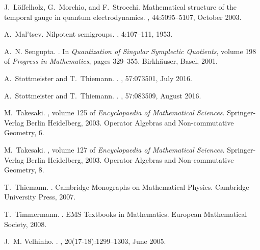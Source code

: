 \documentclass[a4paper,12pt]{amsart}
\numberwithin{equation}{section}
\theoremstyle{definition}
\begin{document}
\begin{thebibliography}{}
J.~L\"offelholz, G.~Morchio, and F.~Strocchi.
\newblock Mathematical structure of the temporal gauge in quantum
  electrodynamics.
, 44:5095--5107, October 2003.

A.~Mal'tsev.
\newblock Nilpotent semigroups.
, 4:107--111, 1953.

A.~N. Sengupta.
.
\newblock In {\em Quantization of Singular Symplectic Quotients}, volume 198 of
  {\em Progress in Mathematics}, pages 329--355. Birkh{\"a}user, Basel, 2001.

A.~Stottmeister and T.~Thiemann.
.
, 57:073501, July 2016.

A.~Stottmeister and T.~Thiemann.
.
, 57:083509, August 2016.

M.~Takesaki.
, volume 125 of {\em
  Encyclopaedia of Mathematical Sciences}.
\newblock Springer-Verlag Berlin Heidelberg, 2003.
\newblock Operator Algebras and Non-commutative Geometry, 6.

M.~Takesaki.
, volume 127 of {\em
  Encyclopaedia of Mathematical Sciences}.
\newblock Springer-Verlag Berlin Heidelberg, 2003.
\newblock Operator Algebras and Non-commutative Geometry, 8.

T.~Thiemann.
.
\newblock Cambridge Monographs on Mathematical Physics. Cambridge University
  Press, 2007.

T.~Timmermann.
.
\newblock EMS Textbooks in Mathematics. European Mathematical Society, 2008.

J.~M. {V}elhinho.
.
, 20(17-18):1299--1303, June
  2005.


\end{thebibliography}
\end{document}

